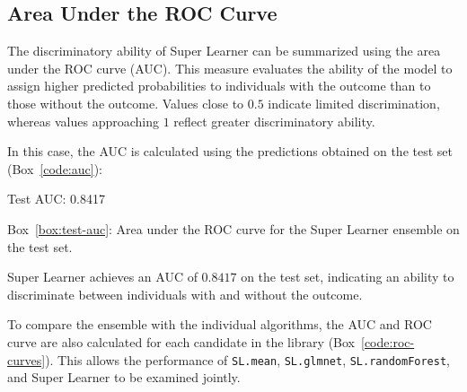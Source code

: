 \documentclass[12pt]{article}
\newcommand{\routputcaption}[2]{%
    \par\smallskip
    \begin{center}
        Box~\ref{#1}: #2
    \end{center}
}
\begin{document}
\subsection{Area Under the ROC Curve}

The discriminatory ability of Super Learner can be summarized using the area under the ROC curve (AUC). This measure evaluates the ability of the model to assign higher predicted probabilities to individuals with the outcome than to those without the outcome. Values close to $0.5$ indicate limited discrimination, whereas values approaching $1$ reflect greater discriminatory ability.

In this case, the AUC is calculated using the predictions obtained on the test set (Box~\ref{code:auc}):


\begin{routputref}[label={box:test-auc}]
	Test AUC: 0.8417
\end{routputref}

\routputcaption{box:test-auc}
{Area under the ROC curve for the Super Learner ensemble on the test set.}

Super Learner achieves an AUC of $0.8417$ on the test set, indicating an ability to discriminate between individuals with and without the outcome.

To compare the ensemble with the individual algorithms, the AUC and ROC curve are also calculated for each candidate in the library (Box~\ref{code:roc-curves}). This allows the performance of \texttt{SL.mean}, \texttt{SL.glmnet}, \texttt{SL.randomForest}, and Super Learner to be examined jointly.
\end{document}
